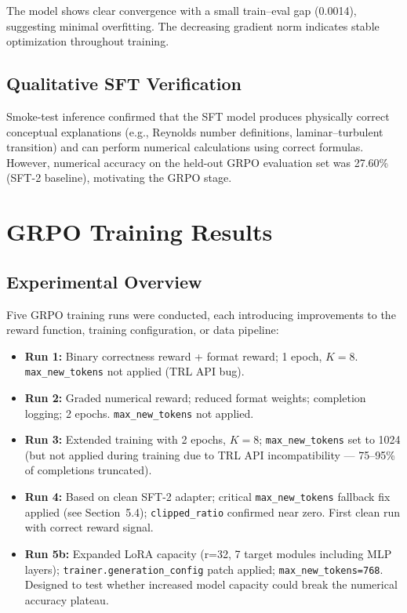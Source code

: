 \documentclass[12pt]{report}
\begin{document}
The model shows clear convergence with a small train--eval gap (0.0014), suggesting minimal overfitting. The decreasing gradient norm indicates stable optimization throughout training.

\subsection{Qualitative SFT Verification}

Smoke-test inference confirmed that the SFT model produces physically correct conceptual explanations (e.g., Reynolds number definitions, laminar--turbulent transition) and can perform numerical calculations using correct formulas. However, numerical accuracy on the held-out GRPO evaluation set was 27.60\% (SFT-2 baseline), motivating the GRPO stage.

\section{GRPO Training Results}

\subsection{Experimental Overview}

Five GRPO training runs were conducted, each introducing improvements to the reward function, training configuration, or data pipeline:

\begin{itemize}
    \item \textbf{Run 1:} Binary correctness reward + format reward; 1 epoch, $K=8$. \texttt{max\_new\_tokens} not applied (TRL API bug).
    \item \textbf{Run 2:} Graded numerical reward; reduced format weights; completion logging; 2 epochs. \texttt{max\_new\_tokens} not applied.
    \item \textbf{Run 3:} Extended training with 2 epochs, $K=8$; \texttt{max\_new\_tokens} set to 1024 (but not applied during training due to TRL API incompatibility --- 75--95\% of completions truncated).
    \item \textbf{Run 4:} Based on clean SFT-2 adapter; critical \texttt{max\_new\_tokens} fallback fix applied (see Section~5.4); \texttt{clipped\_ratio} confirmed near zero. First clean run with correct reward signal.
    \item \textbf{Run 5b:} Expanded LoRA capacity (r=32, 7 target modules including MLP layers); \texttt{trainer.generation\_config} patch applied; \texttt{max\_new\_tokens=768}. Designed to test whether increased model capacity could break the numerical accuracy plateau.
\end{itemize}
\end{document}
